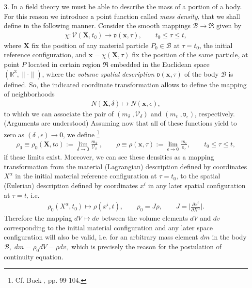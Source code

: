 \documentclass[12pt]{article}
\begin{document}
3. In a field theory we must be able to describe the mass of a portion of a body. For this reason we introduce a point function called {\em mass density}, that we shall define in the following manner. Consider the smooth mappings $\mathscr{B}\to\Re$ given by
\begin{align}
\chi:\mathscr{V}(\mathbf{X},t_0)\rightarrow\mathfrak{v}(\mathbf{x},\tau), 
\qquad t_0\leq\tau\leq{t},
\end{align}  
where $\mathbf{X}$ fix the position of any material particle $P_0\in\mathscr{B}$ at $\tau=t_0$, the initial reference configuration, and  $\mathbf{x}=\chi(\mathbf{X},\tau)$ fix the position of the same particle, at  point $P$ located in certain region $\Re$ embedded in the Euclidean space $(\mathbb{R}^3,\lVert\cdot\rVert)$, where the {\em volume spatial description} $\mathfrak{v}(\mathbf{x},\tau)$ of the body $\mathscr{B}$ is defined. So, the indicated coordinate transformation allows to define the mapping of neighborhoods
\begin{align*}
N(\mathbf{X},\delta)\mapsto N(\mathbf{x},\epsilon),
\end{align*}
to which we can associate the  pair of  $(m_\delta\;,\mathscr{V}_\delta)$ and $(m_\epsilon\;,\mathfrak{v}_\epsilon)$, respectively. (Arguments are understood) Assuming now that all of these functions yield to zero as $(\delta\;,\epsilon)\to{0}$, we define {\footnote{Cf. Buck \cite{cite:Buck}, pp. 99-104.}}
\begin{align}
\rho_0\equiv\rho_0(\mathbf{X},to):=
\lim_{\delta\to{0}}\frac{m_\delta}{\mathscr{V}_\delta}\;, \qquad
\rho\equiv\rho(\mathbf{x},\tau):=
\lim_{\epsilon\to{0}}\frac{m_\epsilon}{\mathfrak{v}_\epsilon},\qquad t_0\leq\tau\leq{t},
\end{align}
if these limits exist. Moreover, we can see these densities as a mapping transformation from the material (Lagrangian) description defined by coordinates $X^\alpha$ in the initial material reference configuration at $\tau=t_0$, to the spatial (Eulerian) description defined by coordinates $x^i$ in any later spatial configuration at $\tau=t$, i.e.
\begin{align}
\rho_0(X^\alpha,t_0)\mapsto\rho(x^i,t), \qquad \rho_0=J\rho, \qquad 
J=\bigg\vert\frac{\partial{x^i}}{\partial{X^\alpha}}\bigg\vert.
\end{align}
Therefore the mapping $dV\mapsto{dv}$ between the volume elements $dV$ and $dv$ corresponding to the initial material configuration and  any later space configuration will also be valid, i.e. for an arbitrary mass element $dm$ in the body $\mathscr{B},$ $dm=\rho_0{dV}=\rho{dv},$ which is precisely the reason for the postulation of continuity equation.
\end{document}
